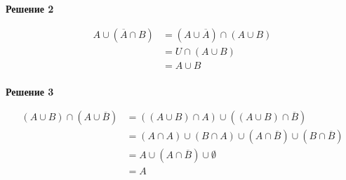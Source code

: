 \documentclass{article}
\begin{document}
\textbf{Решение 2}

\begin{equation} 
\begin{split}
A \cup (\overline{A} \cap B) 
& = (A \cup \overline{A}) \cap (A \cup B) \\
& = U \cap (A \cup B) \\
& = A \cup B \\
\end{split}
\end{equation}

\textbf{Решение 3}

\begin{equation} 
\begin{split}
(A \cup B) \cap (A \cup \overline{B}) 
& = ((A \cup B) \cap A) \cup ((A \cup B) \cap \overline{B}) \\
& = (A \cap A) \cup (B \cap A) \cup (A \cap \overline{B}) \cup (B \cap \overline{B}) \\
& = A \cup (A \cap \overline{B}) \cup \emptyset \\
& = A  \\
\end{split}
\end{equation}
\end{document}
